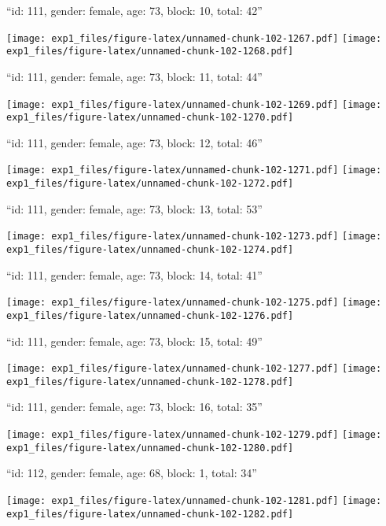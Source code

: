 \documentclass[11pt,,]{article}
\begin{document}
\newpage
[1] 

``id: 111, gender: female, age: 73, block: 10, total: 42''

\texttt{[image: exp1\_files/figure-latex/unnamed-chunk-102-1267.pdf]}
\texttt{[image: exp1\_files/figure-latex/unnamed-chunk-102-1268.pdf]}

\newpage
[1] 

``id: 111, gender: female, age: 73, block: 11, total: 44''

\texttt{[image: exp1\_files/figure-latex/unnamed-chunk-102-1269.pdf]}
\texttt{[image: exp1\_files/figure-latex/unnamed-chunk-102-1270.pdf]}

\newpage
[1] 

``id: 111, gender: female, age: 73, block: 12, total: 46''

\texttt{[image: exp1\_files/figure-latex/unnamed-chunk-102-1271.pdf]}
\texttt{[image: exp1\_files/figure-latex/unnamed-chunk-102-1272.pdf]}

\newpage
[1] 

``id: 111, gender: female, age: 73, block: 13, total: 53''

\texttt{[image: exp1\_files/figure-latex/unnamed-chunk-102-1273.pdf]}
\texttt{[image: exp1\_files/figure-latex/unnamed-chunk-102-1274.pdf]}

\newpage
[1] 

``id: 111, gender: female, age: 73, block: 14, total: 41''

\texttt{[image: exp1\_files/figure-latex/unnamed-chunk-102-1275.pdf]}
\texttt{[image: exp1\_files/figure-latex/unnamed-chunk-102-1276.pdf]}

\newpage
[1] 

``id: 111, gender: female, age: 73, block: 15, total: 49''

\texttt{[image: exp1\_files/figure-latex/unnamed-chunk-102-1277.pdf]}
\texttt{[image: exp1\_files/figure-latex/unnamed-chunk-102-1278.pdf]}

\newpage
[1] 

``id: 111, gender: female, age: 73, block: 16, total: 35''

\texttt{[image: exp1\_files/figure-latex/unnamed-chunk-102-1279.pdf]}
\texttt{[image: exp1\_files/figure-latex/unnamed-chunk-102-1280.pdf]}

\newpage
[1] 

``id: 112, gender: female, age: 68, block: 1, total: 34''

\texttt{[image: exp1\_files/figure-latex/unnamed-chunk-102-1281.pdf]}
\texttt{[image: exp1\_files/figure-latex/unnamed-chunk-102-1282.pdf]}
\end{document}
